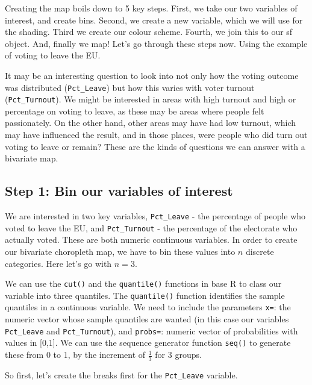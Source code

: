 \documentclass[
]{book}
\begin{document}
Creating the map boils down to 5 key steps. First, we take our two variables of interest, and create bins. Second, we create a new variable, which we will use for the shading. Third we create our colour scheme. Fourth, we join this to our sf object. And, finally we map! Let's go through these steps now. Using the example of voting to leave the EU.

It may be an interesting question to look into not only how the voting outcome was distributed (\texttt{Pct\_Leave}) but how this varies with voter turnout (\texttt{Pct\_Turnout}). We might be interested in areas with high turnout and high or percentage on voting to leave, as these may be areas where people felt passionately. On the other hand, other areas may have had low turnout, which may have influenced the result, and in those places, were people who did turn out voting to leave or remain? These are the kinds of questions we can answer with a bivariate map.

\hypertarget{step-1-bin-our-variables-of-interest}{%
\subsection{Step 1: Bin our variables of interest}\label{step-1-bin-our-variables-of-interest}}

We are interested in two key variables, \texttt{Pct\_Leave} - the percentage of people who voted to leave the EU, and \texttt{Pct\_Turnout} - the percentage of the electorate who actually voted. These are both numeric continuous variables. In order to create our bivariate choropleth map, we have to bin these values into \(n\) discrete categories. Here let's go with \(n = 3\).

We can use the \texttt{cut()} and the \texttt{quantile()} functions in base R to class our variable into three quantiles. The \texttt{quantile()} function identifies the sample quantiles in a continuous variable. We need to include the parameters \texttt{x=}: the numeric vector whose sample quantiles are wanted (in this case our variables \texttt{Pct\_Leave} and \texttt{Pct\_Turnout}), and \texttt{probs=}: numeric vector of probabilities with values in {[}0,1{]}. We can use the sequence generator function \texttt{seq()} to generate these from 0 to 1, by the increment of \(\frac{1}{3}\) for 3 groups.

So first, let's create the breaks first for the \texttt{Pct\_Leave} variable.
\end{document}

